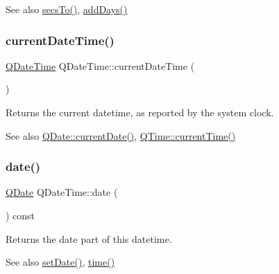\begin{DoxySeeAlso}{See also}
\mbox{\hyperlink{class_q_date_time_a3b697a289865bc96bd339acaa75880b3}{secs\+To()}}, \mbox{\hyperlink{class_q_date_time_adeea3cac98a8c074fecf486094a9bbaf}{add\+Days()}} 
\end{DoxySeeAlso}
\mbox{\label{class_q_date_time_a1e8e27c71617d5c97abe80ee2426a1b4}} 
\subsubsection{\texorpdfstring{currentDateTime()}{currentDateTime()}}
{\footnotesize\ttfamily \mbox{\hyperlink{class_q_date_time}{Q\+Date\+Time}} Q\+Date\+Time\+::current\+Date\+Time (\begin{DoxyParamCaption}{ }\end{DoxyParamCaption})\hspace{0.3cm}{\ttfamily [static]}}

Returns the current datetime, as reported by the system clock.

\begin{DoxySeeAlso}{See also}
\mbox{\hyperlink{class_q_date_a7112e1452f46e40cf349f2e769887e1c}{Q\+Date\+::current\+Date()}}, \mbox{\hyperlink{class_q_time_a39b156ef7067e581f9fd70de6ef9ea4d}{Q\+Time\+::current\+Time()}} 
\end{DoxySeeAlso}
\mbox{\label{class_q_date_time_ae7d86dc9b95e2aeab38391033eeff9eb}} 
\subsubsection{\texorpdfstring{date()}{date()}}
{\footnotesize\ttfamily \mbox{\hyperlink{class_q_date}{Q\+Date}} Q\+Date\+Time\+::date (\begin{DoxyParamCaption}{ }\end{DoxyParamCaption}) const\hspace{0.3cm}{\ttfamily [inline]}}

Returns the date part of this datetime.

\begin{DoxySeeAlso}{See also}
\mbox{\hyperlink{class_q_date_time_aba938ae7007f881a6a641bbdb3ac634a}{set\+Date()}}, \mbox{\hyperlink{class_q_date_time_a7b8eefbd04093747deb22f5cd6b673c1}{time()}} 
\end{DoxySeeAlso}
\mbox{\label{class_q_date_time_a80a194c8ecef4133a9bff3aeb4546934}} 
